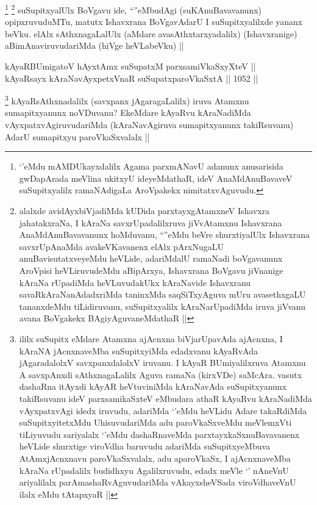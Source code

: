 \begin{artha}
\footnote{`\stext'eMdu mAMDUkayxdalilx Agama parxmANavU adanunx anusarisida gwDapArada meVlina ukitxyU ideyeMdathaR, ideV AnaMdAnuBavaveV suSupitxyalilx ramaNAdigaLa AroVpakekx nimitatxvAguvudu.}
\footnote{alalxde avidAyxbiVjadiMda kUDida parxtayxgAtamxneV Ishavxra ja{ha}takxraNa, I kAraNa savxrUpadalilxruva jiVvAtamxnu Ishavxrana AnaMdAnuBavavanunx hoMduvanu, ``\stext''eMdu beVre shurxtiyalUlx Ishavxrana savxrUpAnaMda avakeVKavanenx elAlx pArxNugaLU anuBavisutatxveyeMdu heVLide, adariMdalU ramaNadi boVgavanunx AroVpisi heVLiruvudeMdu aBipArxya, Ishavxrana BoVgavu jiVnanige kAraNa rUpadiMda heVLuvudakUkx kAraNavide Ishavxranu savaRkAraNanAdadxriMda taninxMda saqSiTxyAguva mUru avasethxgaLU tananxdeMdu tiLidiruvanu, suSupitxyalilx kAraNarUpadiMda iruva jiVvanu avana BoVgakekx BAgiyAguvaneMdathaR ||}
suSupitxyalUlx BoVgavu ide, ``\stext''eMbudAgi (suKAnuBavavanunx) opipxruvuduMTu, matutx Ishavxrana BoVgavAdarU I suSupitxyalilxde yananx beVku. elAlx sAthxnagaLalUlx (aMdare avasAthxtarxyadalilx) (Ishavxranige) aBimAnaviruvudariMda (hiVge heVLabeVku) ||
\end{artha}


\begin{shl}
kAyaRBUmigatoV hAyxtAmx suSupatxM parxsamiVkaSxyXteV || \\
kAyaRsayx kAraNavAyxpetxVnaR suSupatxparoVkaSxtA ||  1052 ||  
\end{shl}

\begin{artha}
\footnote{ililx suSupitx eMdare Atamxna ajAcnxna biVjarUpavAda ajAcnxna, I kAraNA jAcnxnaveMba suSupitxyiMda edadxvanu kAyaRvAda jAgaradalolxV savxpanxdalolxV iruvanu. I kAyaR BUmiyalilxruva Atamxnu A savxpAnxdi sAthxnagaLalilx Aguva ramaNa (kirxVDe) saMcAra. vasutx dashaRna itAyxdi kAyAR heVtuviniMda kAraNavAda suSupitxyanunx takiRsuvanu ideV parxsamikaSxteV eMbudara athaR kAyaRvu kAraNadiMda vAyxpatxvAgi idedx iruvudu, adariMda `\stext'eMdu heVLidu Adare takaRdiMda suSupitxyitetxMdu UhisuvudariMda adu paroVkaSxveMdu meVlemxVti tiLiyuvudu sariyalalx `\stext'eMdu dashaRnaveMda parxtayxkaSxnuBavavanenx heVLide shurxtige viroVdha baruvudu adariMda suSupitxyeMbuva AtAmxjAcnxnavu paroVkaSxvalalx, adu aparoVkaSx, I ajAcnxnaveMba kAraNa rUpadalilx budidhxyu Agalilxruvudu, edadx meVle `\stext' nAneVnU ariyalilalx parAmashaRvAguvudariMda vAkayxsheVSada viroVdhaveVnU ilalx eMdu tAtapxyaR ||}
kAyaRsAthxnadalilx (savxpanx jAgaragaLalilx) iruva Atamxnu sumapitxyanunx noVDuvanu? EkeMdare kAyaRvu kAraNadiMda vAyxpatxvAgiruvudariMda (kAraNavAgiruva sumapitxyanunx takiRsuvanu) AdarU sumapitxyu paroVkaSxvalalx ||
\end{artha}

